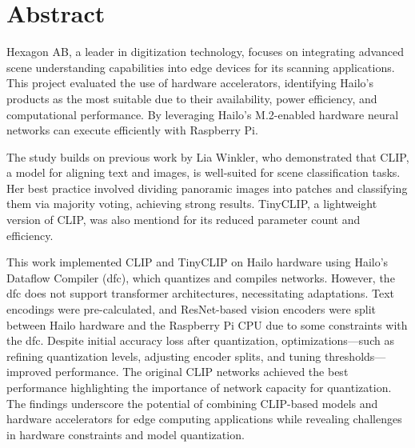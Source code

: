 %
%
%

\chapter*{Abstract}

 Hexagon AB, a leader in digitization technology, focuses on integrating advanced scene understanding capabilities into edge devices for its scanning applications.
 This project evaluated the use of hardware accelerators, identifying Hailo's products as the most suitable due to their availability, power efficiency, and computational performance.
 By leveraging Hailo's M.2-enabled hardware neural networks can execute efficiently with Raspberry Pi.

The study builds on previous work by Lia Winkler, who demonstrated that CLIP, a model for aligning text and images, is well-suited for scene classification tasks.
Her best practice involved dividing panoramic images into patches and classifying them via majority voting, achieving strong results. TinyCLIP, a lightweight version of CLIP, was also mentiond for its reduced parameter count and efficiency.
    
This work implemented CLIP and TinyCLIP on Hailo hardware using Hailo’s Dataflow Compiler (\acrfull{dfc}), which quantizes and compiles networks.
However, the \acrshort{dfc} does not support transformer architectures, necessitating adaptations. Text encodings were pre-calculated, and ResNet-based vision encoders were split between Hailo hardware and the Raspberry Pi CPU due to some constraints with the \acrshort{dfc}.
Despite initial accuracy loss after quantization, optimizations—such as refining quantization levels, adjusting encoder splits, and tuning thresholds—improved performance.
The original CLIP networks achieved the best performance highlighting the importance of network capacity for quantization.
The findings underscore the potential of combining CLIP-based models and hardware accelerators for edge computing applications while revealing challenges in hardware constraints and model quantization. 

	
	